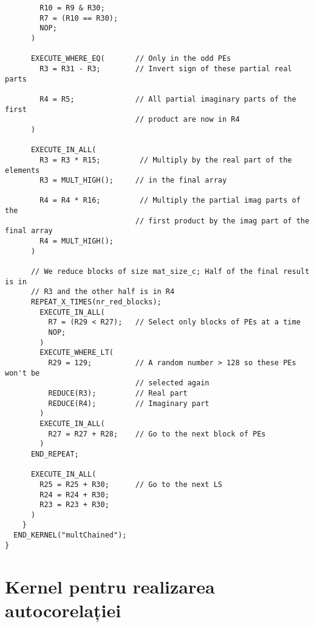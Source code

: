 \begin{lstlisting}
        R10 = R9 & R30;
        R7 = (R10 == R30);
        NOP;
      )

      EXECUTE_WHERE_EQ(       // Only in the odd PEs
        R3 = R31 - R3;        // Invert sign of these partial real parts

        R4 = R5;              // All partial imaginary parts of the first
                              // product are now in R4
      )

      EXECUTE_IN_ALL(
        R3 = R3 * R15;         // Multiply by the real part of the elements
        R3 = MULT_HIGH();     // in the final array

        R4 = R4 * R16;         // Multiply the partial imag parts of the
                              // first product by the imag part of the final array
        R4 = MULT_HIGH();
      )

      // We reduce blocks of size mat_size_c; Half of the final result is in
      // R3 and the other half is in R4
      REPEAT_X_TIMES(nr_red_blocks);
        EXECUTE_IN_ALL(
          R7 = (R29 < R27);   // Select only blocks of PEs at a time
          NOP;
        )
        EXECUTE_WHERE_LT(
          R29 = 129;          // A random number > 128 so these PEs won't be
                              // selected again
          REDUCE(R3);         // Real part
          REDUCE(R4);         // Imaginary part
        )
        EXECUTE_IN_ALL(
          R27 = R27 + R28;    // Go to the next block of PEs
        )
      END_REPEAT;

      EXECUTE_IN_ALL(
        R25 = R25 + R30;      // Go to the next LS
        R24 = R24 + R30;
        R23 = R23 + R30;
      )
    }
  END_KERNEL("multChained");
}
\end{lstlisting}



\section{Kernel pentru realizarea autocorelației}
\label{sec:kernel-autocorr-code}

